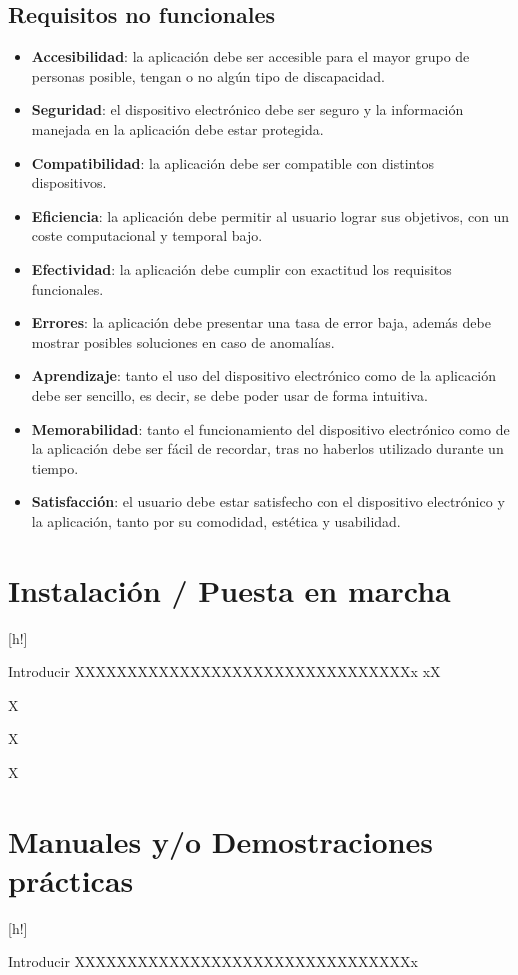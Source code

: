 \subsection{Requisitos no funcionales}
\begin{itemize}
    \item \textbf{Accesibilidad}: la aplicación debe ser accesible para el mayor grupo de personas posible, tengan o no algún tipo de discapacidad.
    \item \textbf{Seguridad}: el dispositivo electrónico debe ser seguro y la información manejada en la aplicación debe estar protegida.
    \item \textbf{Compatibilidad}: la aplicación debe ser compatible con distintos dispositivos.
    \item \textbf{Eficiencia}: la aplicación debe permitir al usuario lograr sus objetivos, con un coste computacional y temporal bajo.
    \item \textbf{Efectividad}: la aplicación debe cumplir con exactitud los requisitos funcionales. 
    \item \textbf{Errores}: la aplicación debe presentar una tasa de error baja, además debe mostrar posibles soluciones en caso de anomalías.
    \item \textbf{Aprendizaje}: tanto el uso del dispositivo electrónico como de la aplicación debe ser sencillo, es decir, se debe poder usar de forma intuitiva.
    \item \textbf{Memorabilidad}: tanto el funcionamiento del dispositivo electrónico como de la aplicación debe ser fácil de recordar, tras no haberlos utilizado durante un tiempo.
    \item \textbf{Satisfacción}: el usuario debe estar satisfecho con el dispositivo electrónico y la aplicación, tanto por su comodidad, estética y usabilidad.


\end{itemize}

\clearpage
\section{Instalación / Puesta en marcha}[h!]

Introducir XXXXXXXXXXXXXXXXXXXXXXXXXXXXXXXXx
xX

X

X

X



\section{Manuales y/o Demostraciones prácticas}[h!]

Introducir XXXXXXXXXXXXXXXXXXXXXXXXXXXXXXXXx




    
     